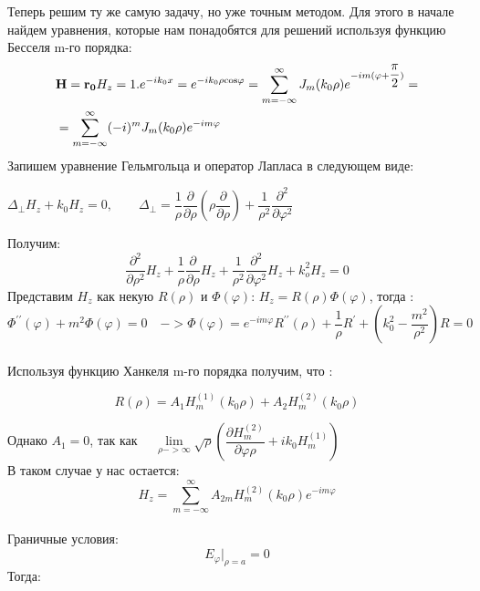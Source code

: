 Теперь решим ту же самую задачу, но уже точным методом. Для этого в начале найдем уравнения, которые нам понадобятся для решений используя функцию Бесселя m-го порядка:
\begin{align}
	&\vec{H} = \vec{r_{0}}H_{z}
	 = 1.e^{-ik_{0}x} = e^{-ik_{0}\rho \rm cos\varphi} = 
	\sum\limits_{m=-\infty}^{\infty} J_{m}(k_{0}\rho)e^{-im(\varphi + \dfrac{\pi}{2})} =\notag\\
	&= \sum\limits_{m=-\infty}^{\infty} (-i)^{m}J_{m}(k_{0}\rho)e^{-im\varphi}
\end{align}
Запишем уравнение Гельмгольца и оператор Лапласа в следующем виде:
\begin{center}
	$ 
	\Delta_{\perp}H_{z} + k_{0}H_{z} = 0, \qquad
	\Delta_{\perp} = \dfrac{1}{\rho}
	\dfrac{\partial}{\partial \rho} 
	(\rho \dfrac{\partial}{\partial \rho}) + 
	\dfrac{1}{\rho^{2}}
	\dfrac{\partial^{2}}{\partial \varphi^{2}} 
	$
\end{center}
Получим:
\begin{equation}
	\dfrac{\partial^{2}}{\partial \rho^{2}}H_{z}  +
\dfrac{1}{\rho}\dfrac{\partial}{\partial \rho}H_{z} +
\dfrac{1}{\rho^{2}}\dfrac{\partial^{2}}{\partial \varphi^{2}}H_{z}+
k_{o}^{2}H_{z} = 0
\end{equation}
Представим $ H_{z} $ как некую $ R(\rho) $ и $ \Phi(\varphi) $:\quad
$ H_{z} = R(\rho)\Phi(\varphi) $, \qquad тогда : \\
\begin{equation}
\Phi^{\prime\prime}(\varphi) + m^2\Phi(\varphi) = 0 \quad -> \Phi(\varphi) = e^{-im\varphi}R^{\prime\prime}(\rho) + \dfrac{1}{\rho} R^{\prime} + (k_{0}^{2} - \dfrac{m^{2}}{\rho^{2}})R = 0
\end{equation}
\\
Используя функцию Ханкеля m-го порядка получим, что :
\begin{center}
	$$ R(\rho) = A_{1}H_{m}^{(1)}(k_{0}\rho) + A_{2}H_{m}^{(2)}(k_{0}\rho) $$
\end{center}
Однако \quad  $ A_{1} = 0 $, \quad так как
$\quad \lim\limits_{\rho -> \infty}\sqrt{\rho}
(\dfrac{\partial H_{m}^{(2)}}{\partial \varphi \rho} + ik_{0}H_{m}^{(1)} )
$ \\
В таком случае у нас остается: \\
$$
H_{z} = \sum_{m=-\infty}^{\infty}A_{2m}H_{m}^{(2)}(k_{0}\rho)e^{-im\varphi}
$$
\\
Граничные условия:
\begin{equation}
	E_{\varphi}|_{\rho=a} = 0
\end{equation}
Тогда:
